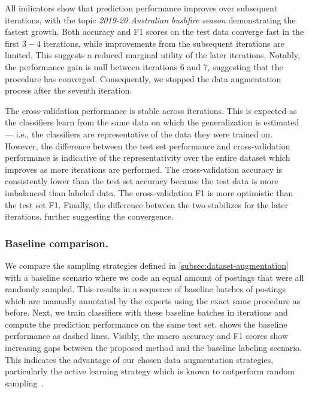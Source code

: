 All indicators show that prediction performance improves over subsequent iterations, with the topic \textit{2019-20 Australian bushfire season} demonstrating the fastest growth.
Both accuracy and F1 scores on the test data converge fast in the first $3-4$ iterations, while improvements from the subsequent iterations are limited.
This suggests a reduced marginal utility of the later iterations.
Notably, the performance gain is null between iterations 6 and 7, suggesting that the procedure has converged.
Consequently, we stopped the data augmentation process after the seventh iteration.

The cross-validation performance is stable across iterations.
This is expected as the classifiers learn from the same data on which the generalization is estimated --- i.e., the classifiers are representative of the data they were trained on.
However, the difference between the test set performance and cross-validation performance is indicative of the representativity over the entire dataset which improves as more iterations are performed.
The cross-validation accuracy is consistently lower than the test set accuracy because the test data is more imbalanced than labeled data.
The cross-validation F1 is more optimistic than the test set F1.
Finally, the difference between the two stabilizes for the later iterations, further suggesting the convergence.

\subsubsection{Baseline comparison.} 
We compare the sampling strategies defined in \cref{subsec:dataset-augmentation} with a baseline scenario where we code an equal amount of postings that were all randomly sampled. 
This results in a sequence of baseline batches of postings which are manually annotated by the experts using the exact same procedure as before.
Next, we train classifiers with these baseline batches in iterations and compute the prediction performance on the same test set.
 shows the baseline performance as dashed lines.
Visibly, the macro accuracy and F1 scores show increasing gaps between the proposed method and the baseline labeling scenario.
This indicates the advantage of our chosen data augmentation strategies, particularly the active learning strategy which is known to outperform random sampling~\citep{tran2018combining}.









